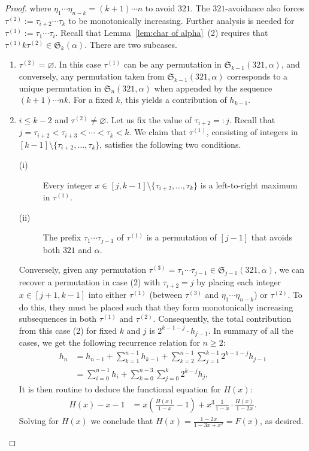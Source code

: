 \documentclass[12pt]{amsart}
\numberwithin{equation}{section}
\theoremstyle{plain}
\def\fS{\mathfrak{S}}
\begin{document}
\begin{proof}
where $\eta_1\cdots\eta_{n-k}=(k+1)\cdots n$ to avoid $321$. The $321$-avoidance also forces $\tau^{(2)}:=\tau_{i+2}\cdots\tau_k$ to be monotonically increasing. Further analysis is needed for $\tau^{(1)}:=\tau_1\cdots\tau_i$. Recall that Lemma~\ref{lem:char of alpha}~(2) requires that $\tau^{(1)}k\tau^{(2)}\in\fS_k(\alpha)$. There are two subcases.
\begin{enumerate}
	\item $\tau^{(2)}=\varnothing$. In this case $\tau^{(1)}$ can be any permutation in $\fS_{k-1}(321,\alpha)$, and conversely, any permutation taken from $\fS_{k-1}(321,\alpha)$ corresponds to a unique permutation in $\fS_n(321,\alpha)$ when appended by the sequence $(k+1)\cdots nk$. For a fixed $k$, this yields a contribution of $h_{k-1}$.
	\item $i\le k-2$ and $\tau^{(2)}\neq\varnothing$. Let us fix the value of $\tau_{i+2}=:j$. Recall that $j=\tau_{i+2}<\tau_{i+3}<\cdots<\tau_k<k$. We claim that $\tau^{(1)}$, consisting of integers in $[k-1]\setminus\{\tau_{i+2},\ldots,\tau_k\}$, satisfies the following two conditions.
	\begin{description}
		\item[(i)] Every integer $x\in [j,k-1]\setminus\{\tau_{i+2},\ldots,\tau_k\}$ is a left-to-right maximum in $\tau^{(1)}$.
		\item[(ii)] The prefix $\tau_1\cdots\tau_{j-1}$ of $\tau^{(1)}$ is a permutation of $[j-1]$ that avoids both $321$ and $\alpha$.
	\end{description}
	Conversely, given any permutation $\tau^{(3)}=\tau_1\cdots\tau_{j-1}\in\fS_{j-1}(321,\alpha)$, we can recover a permutation in case (2) with $\tau_{i+2}=j$ by placing each integer $x\in [j+1,k-1]$ into either $\tau^{(1)}$ (between $\tau^{(3)}$ and $\eta_1\cdots\eta_{n-k}$) or $\tau^{(2)}$. To do this, they must be placed such that they form monotonically increasing subsequences in both $\tau^{(1)}$ and $\tau^{(2)}$. Consequently, the total contribution from this case (2) for fixed $k$ and $j$ is $2^{k-1-j}\cdot h_{j-1}$. In summary of all the cases, we get the following recurrence relation for $n\ge 2$:
	\begin{align*}
	h_n &= h_{n-1}+\sum_{k=1}^{n-1}h_{k-1}+\sum_{k=2}^{n-1}\sum_{j=1}^{k-1}2^{k-1-j}h_{j-1} \\
	&= \sum_{i=0}^{n-1}h_i+\sum_{k=0}^{n-3}\sum_{j=0}^{k}2^{k-j}h_j,
	\end{align*}
	It is then routine to deduce the functional equation for $H(x)$:
	\begin{align*}
	H(x)-x-1 &= x\left(\frac{H(x)}{1-x}-1\right)+x^3\frac{1}{1-x}\cdot \frac{H(x)}{1-2x}.
	\end{align*}
	Solving for $H(x)$ we conclude that $H(x)=\frac{1-2x}{1-3x+x^2}=F(x)$, as desired. 


\end{enumerate}
\end{proof}
\end{document}
